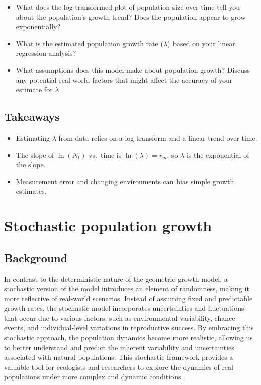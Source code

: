 \documentclass[
  a4paper]{book}
\providecommand{\tightlist}{%
  \setlength{\itemsep}{0pt}\setlength{\parskip}{0pt}}
\begin{document}
\begin{itemize}
\tightlist
\item
  What does the log-transformed plot of population size over time tell you about the population's growth trend? Does the population appear to grow exponentially?
\item
  What is the estimated population growth rate (\(\lambda\)) based on your linear regression analysis?
\item
  What assumptions does this model make about population growth? Discuss any potential real-world factors that might affect the accuracy of your estimate for \(\lambda\).
\end{itemize}

\section{Takeaways}\label{takeaways-3}

\begin{itemize}
\tightlist
\item
  Estimating \(\lambda\) from data relies on a log-transform and a linear trend over time.
\item
  The slope of \(\ln(N_t)\) vs.~time is \(\ln(\lambda) = r_m\), so \(\lambda\) is the exponential of the slope.
\item
  Measurement error and changing environments can bias simple growth estimates.
\end{itemize}

\chapter{Stochastic population growth}\label{stochastic-population-growth}

\section{Background}\label{background-4}

In contrast to the deterministic nature of the geometric growth model, a stochastic version of the model introduces an element of randomness, making it more reflective of real-world scenarios. Instead of assuming fixed and predictable growth rates, the stochastic model incorporates uncertainties and fluctuations that occur due to various factors, such as environmental variability, chance events, and individual-level variations in reproductive success. By embracing this stochastic approach, the population dynamics become more realistic, allowing us to better understand and predict the inherent variability and uncertainties associated with natural populations. This stochastic framework provides a valuable tool for ecologists and researchers to explore the dynamics of real populations under more complex and dynamic conditions.
\end{document}
